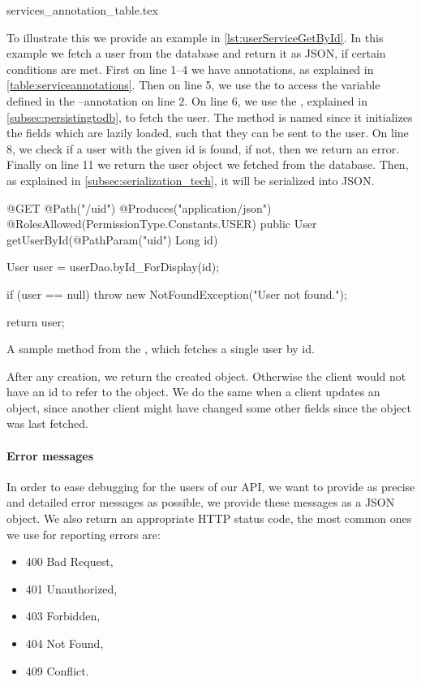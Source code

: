 {services_annotation_table.tex}

\bigskip
To illustrate this we provide an example in \cref{lst:userServiceGetById}.
In this example we fetch a user from the database and return it as JSON, if certain conditions are met.
First on line 1--4 we have annotations, as explained in \cref{table:serviceannotations}.
Then on line 5, we use the  to access the variable defined in the --annotation on line 2.
On line 6, we use the , explained in \cref{subsec:persistingtodb}, to fetch the user.
The method is named  since it initializes the fields which are lazily loaded, such that they can be sent to the user.
On line 8, we check if a user with the given id is found, if not, then we return an error.
Finally on line 11 we return the user object we fetched from the database.
Then, as explained in \cref{subsec:serialization_tech}, it will be serialized into JSON.
\begin{listing}
    \begin{java2}
@GET
@Path("/{uid}")
@Produces("application/json")
@RolesAllowed({PermissionType.Constants.USER})
public User getUserById(@PathParam("uid") Long id) {
    User user = userDao.byId_ForDisplay(id);

    if (user == null)
        throw new NotFoundException("User not found.");

    return user;
}
    \end{java2}
    \caption{A sample method from the , which fetches a single user by id.}\label{lst:userServiceGetById}
\end{listing}

After any creation, we return the created object. 
Otherwise the client would not have an id to refer to the object.
We do the same when a client updates an object, 
since another client might have changed some other fields since the object was last fetched. 

\bigskip
\paragraph*{Error messages}
In order to ease debugging for the users of our API, we want to provide as precise and detailed error messages as possible,
we provide these messages as a JSON object.
We also return an appropriate HTTP status code, the most common ones we use for reporting errors are:
\begin{multicols}{3}
\begin{itemize}
    \item 400 Bad Request,
    \item 401 Unauthorized,
    \item 403 Forbidden,
    \item 404 Not Found,
    \item 409 Conflict.
\end{itemize}
\end{multicols}

